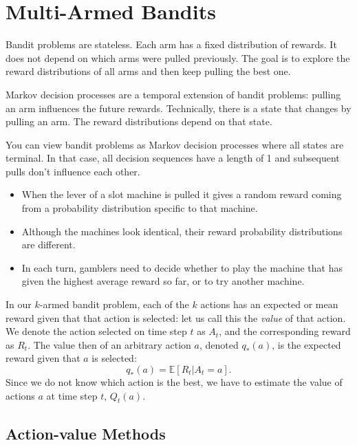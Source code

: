 \section{Multi-Armed Bandits}


Bandit problems are stateless. Each arm has a fixed distribution of rewards. It does not depend on which arms were pulled previously. The goal is to explore the reward distributions of all arms and then keep pulling the best one.

Markov decision processes are a temporal extension of bandit problems: pulling an arm influences the future rewards. Technically, there is a state that changes by pulling an arm. The reward distributions depend on that state.

You can view bandit problems as Markov decision processes where all states are terminal. In that case, all decision sequences have a length of 1 and subsequent pulls don't influence each other.

\begin{itemize}
	\item When the lever of a slot machine is pulled it gives a random reward coming from a probability distribution specific to that machine.
	\item Although the machines look identical, their reward probability distributions are different. 
	\item In each turn, gamblers need to decide whether to play the machine that has given the highest average reward so far, or to try another machine. 
\end{itemize}

In our $k$-armed bandit problem, each of the $k$ actions has an expected or mean reward given that that action is selected: let us call this the \textit{value} of that action. We denote the action selected on time step $t$ as $A_t$, and the corresponding reward as $R_t$. The value then of an arbitrary action $a$, denoted $q_*(a)$, is the expected reward given that $a$ is selected:
$$q_*(a) = \mathbb{E}[R_t|A_t=a].$$
Since we do not know which action is the best, we have to estimate the value of actions $a$ at time step $t$, $Q_t(a)$.

\subsection{Action-value Methods}

